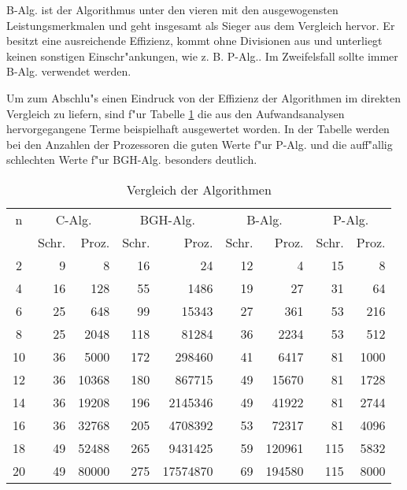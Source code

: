B-Alg. ist der Algorithmus unter den vieren mit den ausgewogensten
Leistungsmerkmalen und geht insgesamt als Sieger aus dem Vergleich hervor.
Er besitzt eine ausreichende Effizienz, kommt ohne Divisionen aus und
unterliegt keinen sonstigen Einschr"ankungen, wie z. B. P-Alg.. Im
Zweifelsfall sollte immer B-Alg. verwendet werden.

Um zum Abschlu"s einen Eindruck von der Effizienz der
Algorithmen im direkten Vergleich
zu liefern, sind f"ur Tabelle \ref{TabVergleich} die aus den
Aufwandsanalysen hervorgegangene Terme beispielhaft ausgewertet worden.
In der Tabelle werden bei den Anzahlen der Prozessoren die guten
Werte f"ur P-Alg. und die auff"allig schlechten Werte f"ur BGH-Alg.
besonders deutlich.

\begin{table}[htb]
    \begin{center}
    \begin{tabular}{|c||r|r||r|r||r|r||r|r|}
        \hline
        n & \multicolumn{2}{|c||}{C-Alg.}   & 
            \multicolumn{2}{|c||}{BGH-Alg.} &
            \multicolumn{2}{|c||}{B-Alg.}   &
            \multicolumn{2}{|c|}{P-Alg.} \\
        \cline{2-9}
          & Schr. & Proz. & Schr. & Proz. &
            Schr. & Proz. & Schr. & Proz. \\
        \hline
        2 & 9 & 8  & 16 & 24  & 12 & 4  & 15 & 8 \\ \hline
        4  & 16 & 128  & 55 & 1486  & 19 & 27  & 31 & 64 \\ \hline
        6  & 25 & 648  & 99 & 15343  & 27 & 361  & 53 & 216 \\ \hline
        8  & 25 & 2048  & 118 & 81284  & 36 & 2234  & 53 & 512 \\ \hline
        10  & 36 & 5000  & 172 & 298460  & 41 & 6417  & 81 & 1000 \\ \hline
        12  & 36 & 10368  & 180 & 867715  & 49 & 15670  & 81 & 1728 \\ \hline
        14  & 36 & 19208  & 196 & 2145346  & 49 & 41922  & 81 & 2744 \\ \hline
        16  & 36 & 32768  & 205 & 4708392  & 53 & 72317  & 81 & 4096 \\ \hline 
        18  & 49 & 52488  & 265 & 9431425  & 59 & 120961  & 115 & 5832 \\ \hline
        20  & 49 & 80000  & 275 & 17574870  & 69 & 194580  & 115 & 8000 \\ \hline
    \end{tabular}
    \end{center}
    \caption{Vergleich der Algorithmen}
    \label{TabVergleich}
\end{table}

